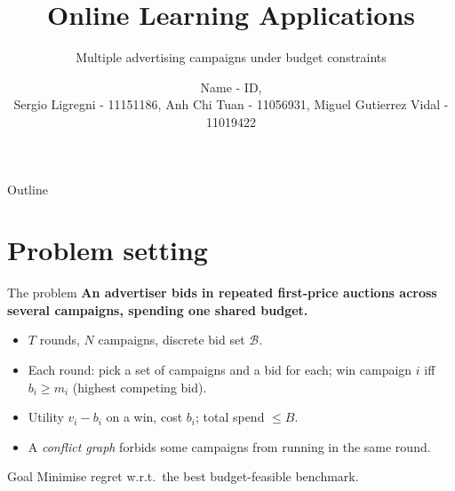 \documentclass[12pt,aspectratio=169]{beamer}
\title{Online Learning Applications}
\subtitle{Multiple advertising campaigns under budget constraints}
\author{
  Name - ID,\\
  Sergio Ligregni - 11151186,
  Anh Chi Tuan - 11056931,
  Miguel Gutierrez Vidal - 11019422
  }
\institute{September 8\textsuperscript{\tiny{th}}, 2026 }
\begin{document}
\aurigatitleframe

\newcommand{\iid}{\stackrel{\tiny{iid}}{\sim}}
\newcommand{\ind}{\stackrel{\tiny{ind}}{\sim}}

\newcommand{\bidset}{\mathcal{B}}
\newcommand{\campaigns}{\mathcal{N}}
\newcommand{\superarms}{\mathcal{S}}
\newcommand{\OPT}{\mathrm{OPT}}
\newcommand{\ucb}{\widehat{f}^{\,\mathrm{UCB}}}
\newcommand{\lcb}{\widehat{c}^{\,\mathrm{LCB}}}

\newcommand{\figphx}[3]{%
  \fbox{\parbox[c][#2][c]{#1}{\centering\ttfamily\small #3}}}
\newcommand{\figph}[2][0.8\textwidth]{\figphx{#1}{3.2cm}{#2}}


\begin{frame}{Outline}
  \tableofcontents
\end{frame}


\section{Problem setting}

\begin{frame}{The problem}
\footnotesize
  \textbf{An advertiser bids in repeated first-price auctions across several campaigns, spending one shared budget.}
  \begin{itemize}
    \item $T$ rounds, $N$ campaigns, discrete bid set $\bidset$.
    \item Each round: pick a set of campaigns and a bid for each; win campaign $i$ iff
          $b_i \ge m_i$ (highest competing bid).
    \item Utility $v_i - b_i$ on a win, cost $b_i$; total spend $\le B$.
    \item A \emph{conflict graph} forbids some campaigns from running in the same round.
  \end{itemize}
  \begin{block}{Goal}
    Minimise regret w.r.t.\ the best budget-feasible benchmark.
  \end{block}
\end{frame}
\end{document}
